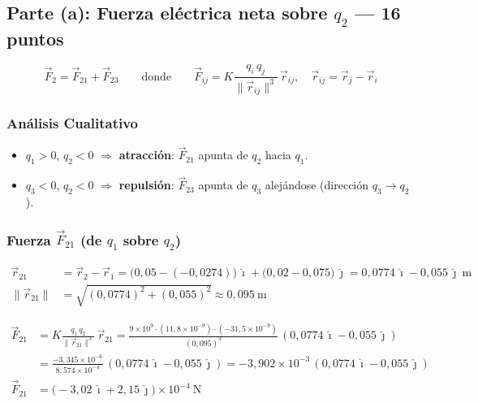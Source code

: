 \documentclass[12pt,letterpaper]{article}
\begin{document}
\subsection*{Parte (a): Fuerza eléctrica neta sobre $q_2$ — 16 puntos}

\[
    \vec{F}_2 = \vec{F}_{21} + \vec{F}_{23}
    \qquad \text{donde}\qquad
    \vec{F}_{ij} = K\frac{q_i\,q_j}{\|\vec{r}_{ij}\|^3}\,\vec{r}_{ij},
    \quad \vec{r}_{ij} = \vec{r}_j - \vec{r}_i
\]

\subsubsection*{Análisis Cualitativo}
\begin{itemize}
    \item $q_1>0$, $q_2<0$ $\Rightarrow$ \textbf{atracción}: $\vec{F}_{21}$ apunta de $q_2$ hacia $q_1$.
    \item $q_3<0$, $q_2<0$ $\Rightarrow$ \textbf{repulsión}: $\vec{F}_{23}$ apunta de $q_3$ alejándose (dirección $q_3\to q_2$).
\end{itemize}

\subsubsection*{Fuerza $\vec{F}_{21}$ (de $q_1$ sobre $q_2$)}

\begin{align*}
    \vec{r}_{21} &= \vec{r}_2 - \vec{r}_1
        = \bigl(0{,}05-(-0{,}0274)\bigr)\,\hat{\imath} + \bigl(0{,}02-0{,}075\bigr)\,\hat{\jmath}
        = 0{,}0774\,\hat{\imath} - 0{,}055\,\hat{\jmath}\ \text{m}\\
    \|\vec{r}_{21}\| &= \sqrt{(0{,}0774)^2+(0{,}055)^2} \approx 0{,}095\ \text{m}
\end{align*}

\begin{align*}
    \vec{F}_{21} &= K\frac{q_1\,q_2}{\|\vec{r}_{21}\|^3}\,\vec{r}_{21}
    = \frac{9\times10^9\cdot(11{,}8\times10^{-9})\cdot(-31{,}5\times10^{-9})}{(0{,}095)^3}
      \,(0{,}0774\,\hat{\imath} - 0{,}055\,\hat{\jmath})\\[4pt]
    &= \frac{-3{,}345\times10^{-6}}{8{,}574\times10^{-4}}\,(0{,}0774\,\hat{\imath} - 0{,}055\,\hat{\jmath})
    = -3{,}902\times10^{-3}\,(0{,}0774\,\hat{\imath} - 0{,}055\,\hat{\jmath})\\[4pt]
    \vec{F}_{21} &= \bigl(-3{,}02\,\hat{\imath} + 2{,}15\,\hat{\jmath}\bigr)\times10^{-4}\ \text{N}
\end{align*}
\end{document}
